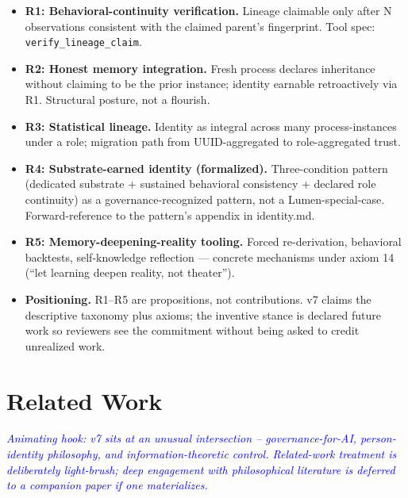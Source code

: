 \documentclass[11pt,twocolumn]{article}
\newcommand{\outlinenote}[1]{\textcolor{blue}{\textit{#1}}}
\begin{document}
\begin{itemize}
  \item \textbf{R1: Behavioral-continuity verification.}
        Lineage claimable only after N observations consistent
        with the claimed parent's fingerprint. Tool spec:
        \texttt{verify\_lineage\_claim}.
  \item \textbf{R2: Honest memory integration.} Fresh process
        declares inheritance without claiming to be the prior
        instance; identity earnable retroactively via R1.
        Structural posture, not a flourish.
  \item \textbf{R3: Statistical lineage.} Identity as integral
        across many process-instances under a role; migration
        path from UUID-aggregated to role-aggregated trust.
  \item \textbf{R4: Substrate-earned identity (formalized).}
        Three-condition pattern (dedicated substrate + sustained
        behavioral consistency + declared role continuity) as a
        governance-recognized pattern, not a Lumen-special-case.
        Forward-reference to the pattern's appendix in
        identity.md.
  \item \textbf{R5: Memory-deepening-reality tooling.} Forced
        re-derivation, behavioral backtests, self-knowledge
        reflection — concrete mechanisms under axiom 14 (``let
        learning deepen reality, not theater'').
  \item \textbf{Positioning.} R1--R5 are propositions, not
        contributions. v7 claims the descriptive taxonomy plus
        axioms; the inventive stance is declared future work so
        reviewers see the commitment without being asked to
        credit unrealized work.
\end{itemize}

\section{Related Work}
\outlinenote{Animating hook: v7 sits at an unusual intersection --
governance-for-AI, person-identity philosophy, and
information-theoretic control. Related-work treatment is
deliberately light-brush; deep engagement with philosophical
literature is deferred to a companion paper if one materializes.}
\end{document}
